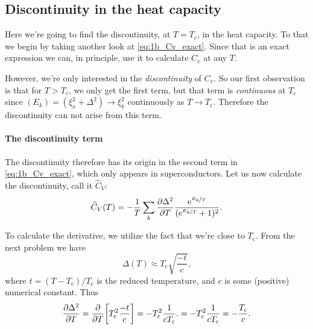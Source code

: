 \documentclass[11pt,letter, swedish, english
]{article}
\newcommand{\Tc}{\ensuremath{T_{\text{c}}}}
\begin{document}
\subsection{Discontinuity in the heat capacity}

Here we're going to find the discontinuity, at $T=\Tc$, in the heat
capacity. To that we begin by taking another look at
\eqref{eq:1b_Cv_exact}. Since that is an exact expression we can, in
principle, use it to calculate $C_v$ at any $T$. 

However, we're only interested in the \emph{discontinuity} of
$C_v$. So our first observation is that for $T>T_c$, we only get the
first term, but that term is \emph{continuous} at $\Tc$ since
$(E_k)=(\xi_x^2+\Delta^2)\to\xi_k^2$ continuously as
$T\to\Tc$. Therefore the discontinuity can not arise from this term.

\paragraph{The discontinuity term}
The discontinuity therefore has its origin in the second term in
\eqref{eq:1b_Cv_exact}, which only appears in superconductors. Let us
now calculate the discontinuity, call it $\widehat{C}_V$:
\begin{equation}
\widehat{C}_V(T)=-\frac{1}{T}\sum_k
\pdv{\Delta^2}{T}
\frac{\mathrm{e}^{\nicefrac{E_k}{T}}}{(\mathrm{e}^{\nicefrac{E_k}{T}}+1)^2}.
\end{equation}

To calculate the derivative, we utilize the fact that we're close to
$\Tc$. From the next problem we have
\begin{equation}
\Delta(T)\approx\Tc\sqrt{\frac{-t}{c}},
\end{equation}
where $t=(T-\Tc)/\Tc$ is the reduced temperature, and $c$ is some
(positive) numerical constant\footnotemark{}. Thus
\begin{equation}
\pdv{\Delta^2}{T}=\pdv{T}\qty[\Tc^2\frac{-t}{c}]=-\Tc^2\frac{1}{c\Tc}.
=-\Tc^2\frac{1}{c\Tc}=-\frac{\Tc}{c}.
\end{equation}

\end{document}
